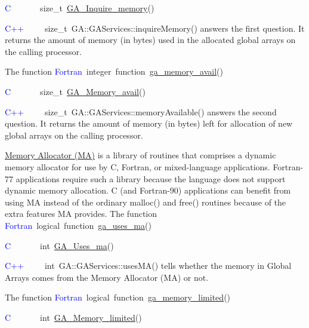 \textcolor{blue}{C}~~~~~~~size\_t~\href{http://www.emsl.pnl.gov/docs/global/c_nga_ops.html\#ga_inquire_memory}{GA\_{}Inquire\_{}memory}()~

\textcolor{blue}{C++~}~~~~size\_t~GA::GAServices::inquireMemory()
answers the first question. It returns the amount of memory (in bytes)
used in the allocated global arrays on the calling processor.

The function
\textcolor{blue}{Fortran}~integer~function~\href{http://www.emsl.pnl.gov/docs/global/ga_ops.html\#ga_memory_avail}{ga\_{}memory\_{}avail}()~

\textcolor{blue}{C}~~~~~~~size\_t~\href{http://www.emsl.pnl.gov/docs/global/c_nga_ops.html\#ga_memory_avail}{GA\_{}Memory\_{}avail}()~

\textcolor{blue}{C++}~~~~~size\_t~GA::GAServices::memoryAvailable()
answers the second question. It returns the amount of memory (in bytes)
left for allocation of new global arrays on the calling processor.

\href{http://www.emsl.pnl.gov/docs/parsoft/ma/MAapi.html}{Memory Allocator (MA)}
is a library of routines that comprises a dynamic memory allocator
for use by C, Fortran, or mixed-language applications. Fortran- 77
applications require such a library because the language does not
support dynamic memory allocation. C (and Fortran-90) applications
can benefit from using MA instead of the ordinary malloc() and free()
routines because of the extra features MA provides. The function
\textcolor{blue}{Fortran}~logical~function~\href{http://www.emsl.pnl.gov/docs/global/ga_ops.html\#ga_uses_ma}{ga\_{}uses\_{}ma}()~

\textcolor{blue}{C}~~~~~~~int~\href{http://www.emsl.pnl.gov/docs/global/c_nga_ops.html\#ga_uses_ma}{GA\_{}Uses\_{}ma}()~

\textcolor{blue}{C++}~~~~~int~GA::GAServices::usesMA()
tells whether the memory in Global Arrays comes from the Memory Allocator
(MA) or not.

The function
\textcolor{blue}{Fortran}~logical~function~\href{http://www.emsl.pnl.gov/docs/global/ga_ops.html\#ga_memory_limited}{ga\_{}memory\_{}limited}()~

\textcolor{blue}{C}~~~~~~~int~\href{http://www.emsl.pnl.gov/docs/global/c_nga_ops.html\#ga_memory_limited}{GA\_{}Memory\_{}limited}()~

